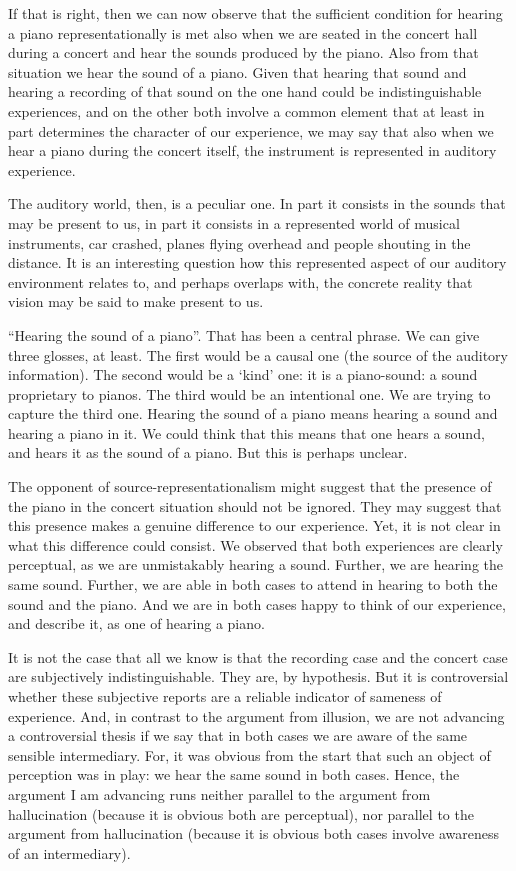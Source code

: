 \documentclass[sloppy, journal, git, bytitle, dodraft]{humapap}
\begin{document}
If that is right, then we can now observe that the sufficient condition for hearing a piano representationally is met also when we are seated in the concert hall during a concert and hear the sounds produced by the piano. Also from that situation we hear the sound of a piano. Given that hearing that sound and hearing a recording of that sound on the one hand could be indistinguishable experiences, and on the other both involve a common element that at least in part determines the character of our experience, we may say that also when we hear a piano during the concert itself, the instrument is represented in auditory experience. 

The auditory world, then, is a peculiar one. In part it consists in the sounds that may be present to us, in part it consists in a represented world of musical instruments, car crashed, planes flying overhead and people shouting in the distance. It is an interesting question how this represented aspect of our auditory environment relates to, and perhaps overlaps with, the concrete reality that vision may be said to make present to us. 

``Hearing the sound of a piano''. That has been a central phrase. We can give three glosses, at least. The first would be a causal one (the source of the auditory information). The second would be a `kind' one: it is a piano-sound: a sound proprietary to pianos. The third would be an intentional one. We are trying to capture the third one. Hearing the sound of a piano means hearing a sound and hearing a piano in it. We could think that this means that one hears a sound, and hears it as the sound of a piano. But this is perhaps unclear. 

The opponent of source-representationalism might suggest that the presence of the piano in the concert situation should not be ignored. They may suggest that this presence makes a genuine difference to our experience. Yet, it is not clear in what this difference could consist. We observed that both experiences are clearly perceptual, as we are unmistakably hearing a sound. Further, we are hearing the same sound. Further, we are able in both cases to attend in hearing to both the sound and the piano. And we are in both cases happy to think of our experience, and describe it, as one of hearing a piano. 

It is not the case that all we know is that the recording case and the concert case are subjectively indistinguishable. They are, by hypothesis. But it is controversial whether these subjective reports are a reliable indicator of sameness of experience. And, in contrast to the argument from illusion, we are not advancing a controversial thesis if we say that in both cases we are aware of the same sensible intermediary. For, it was obvious from the start that such an object of perception was in play: we hear the same sound in both cases. Hence, the argument I am advancing runs neither parallel to the argument from hallucination (because it is obvious both are perceptual), nor parallel to the argument from hallucination (because it is obvious both cases involve awareness of an intermediary). 
\end{document}
